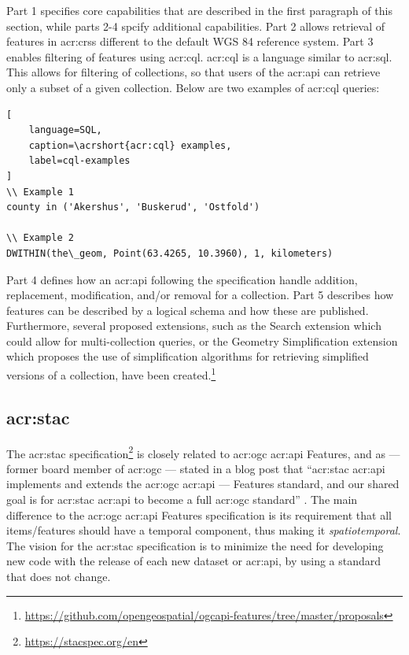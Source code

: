 Part 1 specifies core capabilities that are described in the first paragraph of this section, while parts 2-4 spcify additional capabilities. Part 2 allows retrieval of features in \glspl{acr:crs} different to the default WGS 84 reference system. Part 3 enables filtering of features using \gls{acr:cql}. \gls{acr:cql} is a language similar to \acrshort{acr:sql}. This allows for filtering of collections, so that users of the \acrshort{acr:api} can retrieve only a subset of a given collection. Below are two examples of \gls{acr:cql} queries:

\begin{lstlisting}[
    language=SQL,
    caption=\acrshort{acr:cql} examples,
    label=cql-examples
]
\\ Example 1
county in ('Akershus', 'Buskerud', 'Ostfold')

\\ Example 2
DWITHIN(the\_geom, Point(63.4265, 10.3960), 1, kilometers)
\end{lstlisting}

Part 4 defines how an \acrshort{acr:api} following the specification handle addition,  replacement, modification, and/or removal for a collection. Part 5 describes how features can be described by a logical schema and how these are published. Furthermore, several proposed extensions, such as the Search extension which could allow for multi-collection queries, or the Geometry Simplification extension which proposes the use of simplification algorithms for retrieving simplified versions of a collection, have been created.\footnote{\url{https://github.com/opengeospatial/ogcapi-features/tree/master/proposals}}


\subsection[SpatioTemporal Asset Catalogs]{\acrlong{acr:stac}}
\label{subsec:stac}

The \gls{acr:stac} specification\footnote{\url{https://stacspec.org/en}} is closely related to \acrshort{acr:ogc} \acrshort{acr:api} Features, and as \citeauthor{holmesSpatioTemporalAssetCatalogs2021a} --- former board member  of \acrlong{acr:ogc} --- stated in a blog post that \enquote{\acrshort{acr:stac} \acrshort{acr:api} implements and extends the \acrshort{acr:ogc} \acrshort{acr:api} — Features standard, and our shared goal is for \acrshort{acr:stac} \acrshort{acr:api} to become a full \acrshort{acr:ogc} standard} \citep{holmesSpatioTemporalAssetCatalogs2021a}. The main difference to the \acrshort{acr:ogc} \acrshort{acr:api} Features specification is its requirement that all items/features should have a temporal component, thus making it \textit{spatiotemporal}. The vision for the \acrshort{acr:stac} specification is to minimize the need for developing new code with the release of each new dataset or \acrshort{acr:api}, by using a standard that does not change.







\glsresetall
